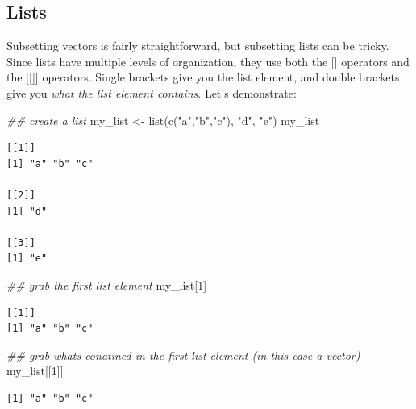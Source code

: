 \documentclass[
  letterpaper,
  DIV=11,
  numbers=noendperiod]{scrreprt}
\newenvironment{Shaded}{\begin{snugshade}}{\end{snugshade}}
\newcommand{\DecValTok}[1]{\textcolor[rgb]{0.68,0.00,0.00}{#1}}
\newcommand{\DocumentationTok}[1]{\textcolor[rgb]{0.37,0.37,0.37}{\textit{#1}}}
\newcommand{\FunctionTok}[1]{\textcolor[rgb]{0.28,0.35,0.67}{#1}}
\newcommand{\NormalTok}[1]{\textcolor[rgb]{0.00,0.23,0.31}{#1}}
\newcommand{\OtherTok}[1]{\textcolor[rgb]{0.00,0.23,0.31}{#1}}
\newcommand{\StringTok}[1]{\textcolor[rgb]{0.13,0.47,0.30}{#1}}
\begin{document}
\subsection{Lists}\label{lists}

Subsetting vectors is fairly straightforward, but subsetting lists can
be tricky. Since lists have multiple levels of organization, they use
both the {[}{]} operators and the {[}{[}{]}{]} operators. Single
brackets give you the list element, and double brackets give you
\emph{what the list element contains}. Let's demonstrate:

\begin{Shaded}
\begin{Highlighting}[]
\DocumentationTok{\#\# create a list }
\NormalTok{my\_list }\OtherTok{\textless{}{-}} \FunctionTok{list}\NormalTok{(}\FunctionTok{c}\NormalTok{(}\StringTok{"a"}\NormalTok{,}\StringTok{"b"}\NormalTok{,}\StringTok{"c"}\NormalTok{), }\StringTok{"d"}\NormalTok{, }\StringTok{"e"}\NormalTok{)}
\NormalTok{my\_list}
\end{Highlighting}
\end{Shaded}

\begin{verbatim}
[[1]]
[1] "a" "b" "c"

[[2]]
[1] "d"

[[3]]
[1] "e"
\end{verbatim}

\begin{Shaded}
\begin{Highlighting}[]
\DocumentationTok{\#\# grab the first list element}
\NormalTok{my\_list[}\DecValTok{1}\NormalTok{]}
\end{Highlighting}
\end{Shaded}

\begin{verbatim}
[[1]]
[1] "a" "b" "c"
\end{verbatim}

\begin{Shaded}
\begin{Highlighting}[]
\DocumentationTok{\#\# grab what\textquotesingle{}s conatined in the first list element (in this case a vector)}
\NormalTok{my\_list[[}\DecValTok{1}\NormalTok{]]}
\end{Highlighting}
\end{Shaded}

\begin{verbatim}
[1] "a" "b" "c"
\end{verbatim}
\end{document}
